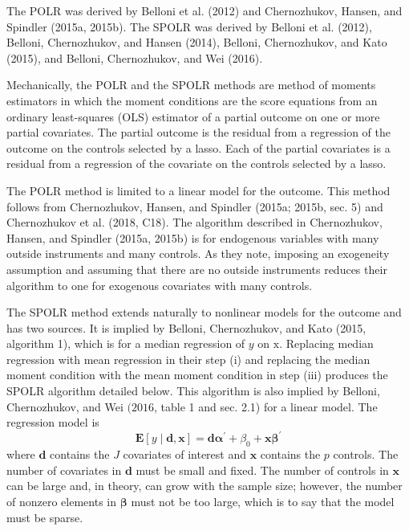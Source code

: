 {The POLR was derived by Belloni et al. (2012) and Chernozhukov, Hansen, and Spindler (2015a, 2015b). The SPOLR was derived by Belloni et al. (2012), Belloni, Chernozhukov, and Hansen (2014), Belloni, Chernozhukov, and Kato (2015), and Belloni, Chernozhukov, and Wei (2016).

Mechanically, the POLR and the SPOLR methods are method of moments estimators in which the moment conditions are the score equations from an ordinary least-squares (OLS) estimator of a partial outcome on one or more partial covariates. The partial outcome is the residual from a regression of the outcome on the controls selected by a lasso. Each of the partial covariates is a residual from a regression of the covariate on the controls selected by a lasso.

The POLR method is limited to a linear model for the outcome. This method follows from Chernozhukov, Hansen, and Spindler (2015a; 2015b, sec. 5) and Chernozhukov et al. (2018, C18). The algorithm described in Chernozhukov, Hansen, and Spindler (2015a, 2015b) is for endogenous variables with many outside instruments and many controls. As they note, imposing an exogeneity assumption and assuming that there are no outside instruments reduces their algorithm to one for exogenous covariates with many controls.

The SPOLR method extends naturally to nonlinear models for the outcome and has two sources. It is implied by Belloni, Chernozhukov, and Kato (2015, algorithm 1), which is for a median regression of $y$ on $\mathrm{x}$. Replacing median regression with mean regression in their step (i) and replacing the median moment condition with the mean moment condition in step (iii) produces the SPOLR algorithm detailed below. This algorithm is also implied by Belloni, Chernozhukov, and Wei $(2016$, table 1 and sec. 2.1) for a linear model.
The regression model is
$$
\mathbf{E}[y \mid \mathbf{d}, \mathbf{x}]=\mathbf{d} \boldsymbol{\alpha}^{\prime}+\beta_{0}+\mathbf{x} \boldsymbol{\beta}^{\prime}
$$
where $\mathbf{d}$ contains the $J$ covariates of interest and $\mathbf{x}$ contains the $p$ controls. The number of covariates in $\mathbf{d}$ must be small and fixed. The number of controls in $\mathbf{x}$ can be large and, in theory, can grow with the sample size; however, the number of nonzero elements in $\boldsymbol{\beta}$ must not be too large, which is to say that the model must be sparse.

}
